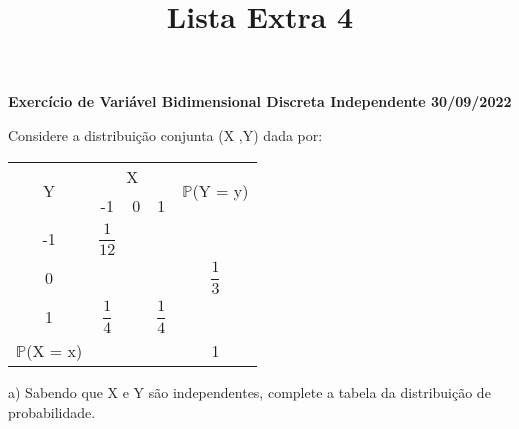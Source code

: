 \documentclass[12pt,a4paper]{article}
\title{Lista Extra 4}
\date{}
\begin{document}
	\maketitle
	\begin{center}
		\textbf{Exercício de Variável Bidimensional Discreta Independente 30/09/2022}
	\end{center}
	Considere a distribuição conjunta (X ,Y) dada por:
	\begin{center}
		\begin{tabular}{|c|c|c|c|c|} \hline
			\multirow{2}{*}{Y} & \multicolumn{3}{c|}{X} & \multirow{2}{*}{$\mathbb{P}$(Y = y)}\\ \cline{2-4}
			& -1 & 0 & 1 & \\ \hline
			-1 & $\dfrac{1}{12}$ & & & \\ \hline
			0 & & & & $\dfrac{1}{3}$\\ \hline
			1 & $\dfrac{1}{4}$ & & $\dfrac{1}{4}$ & \\ \hline
			$\mathbb{P}$(X = x) & & & & 1\\ \hline
		\end{tabular}
	\end{center}
\vspace{1cm}
a) Sabendo que X e Y são independentes, complete a tabela da distribuição de probabilidade.\\
\vspace{1cm}
\end{document}
